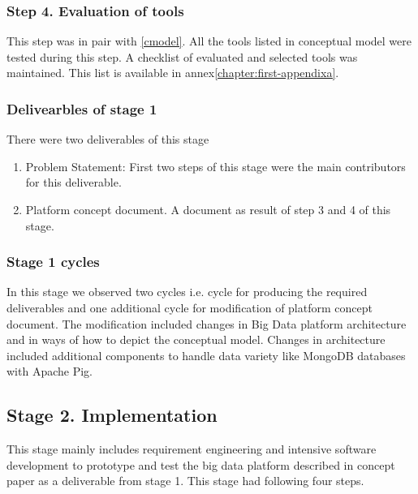 \subsubsection{Step 4. Evaluation of tools}
This step was in pair with \ref{cmodel}. All the tools listed in conceptual model were tested during this step. A checklist of evaluated and selected tools was maintained. This list is available in annex\ref{chapter:first-appendixa}.

\subsubsection{Delivearbles of stage 1}
There were two deliverables of this stage
\begin{enumerate}
\item Problem Statement: First two steps of this stage were the main contributors for this deliverable.
\item Platform concept document. A document as result of step 3 and 4 of this stage. 
\end{enumerate}

\subsubsection{Stage 1 cycles}
In this stage we observed two cycles i.e. cycle for producing the required deliverables and one additional cycle for modification of platform concept document. The modification included changes in Big Data platform architecture and in ways of how to depict the conceptual model. Changes in architecture included additional components to handle data variety like MongoDB databases with Apache Pig. 

\subsection{Stage 2. Implementation}\label{implement}
This stage mainly includes requirement engineering and intensive software development to prototype and test the big data platform described in concept paper as a deliverable from stage 1. This stage had following four steps.
